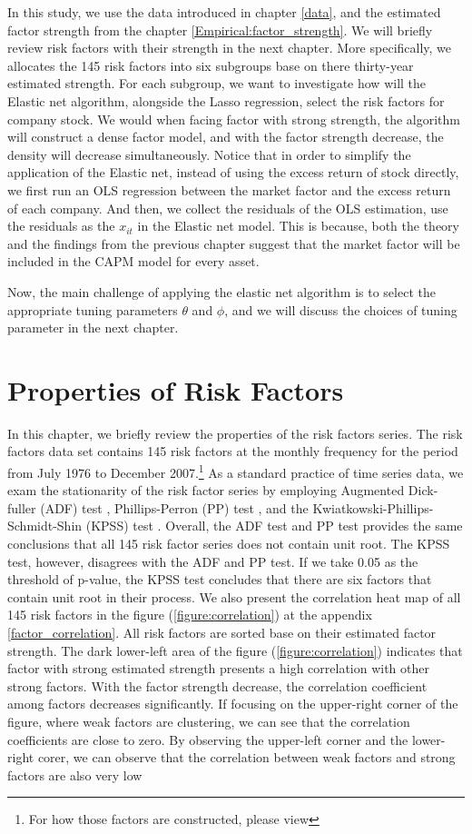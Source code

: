 In this study, we use the data introduced in chapter \ref{data}, and the estimated factor strength from the chapter \ref{Empirical:factor_strength}.
We will briefly review risk factors with their strength in the next chapter.
More specifically, we allocates the 145 risk factors into six subgroups base on there thirty-year estimated strength.
For each subgroup, we want to investigate how will the Elastic net algorithm, alongside the Lasso regression, select the risk factors for company stock.
We would when facing factor with strong strength, the algorithm will construct a dense factor model, and with the factor strength decrease, the density will decrease simultaneously.
Notice that in order to simplify the application of the Elastic net, instead of using the excess return of stock directly, we first run an OLS regression between the market factor and the excess return of each company.
And then, we collect the residuals of the OLS estimation, use the residuals as the $x_{it}$ in the Elastic net model.
This is because, both the theory and the findings from the previous chapter suggest that the market factor will be included in the CAPM model for every asset.

Now, the main challenge of applying the elastic net algorithm is to select the appropriate tuning parameters $\theta$ and $\phi$, and we will discuss the choices of tuning parameter in the next chapter.

\section{Properties of Risk Factors}
In this chapter, we briefly review the properties of the risk factors series. 
The risk factors data set contains 145 risk factors at the monthly frequency for the period from July 1976 to December 2007.\footnote{For how those factors are constructed, please view }
As a standard practice of time series data, we exam the stationarity of the risk factor series by employing Augmented Dick-fuller (ADF) test \cite{Dickey1979},  Phillips-Perron (PP) test \cite{Phillips1988}, and the Kwiatkowski-Phillips-Schmidt-Shin (KPSS) test \cite{Kwiatkowski1992}.
Overall, the ADF test and PP test provides the same conclusions that all 145 risk factor series does not contain unit root.
The KPSS test, however, disagrees with the ADF and PP test.
If we take 0.05 as the threshold of p-value, the KPSS test concludes that there are six factors that contain unit root in their process.
We also present the correlation heat map of all 145 risk factors in the figure (\ref{figure:correlation}) at the appendix \ref{factor_correlation}.
All risk factors are sorted base on their estimated factor strength.
The dark lower-left area of the figure (\ref{figure:correlation}) indicates that factor with strong estimated strength presents a high correlation with other strong factors.
With the factor strength decrease, the correlation coefficient among factors decreases significantly.
If focusing on the upper-right corner of the figure, where weak factors are clustering, we can see that the correlation coefficients are close to zero.
By observing the upper-left corner and the lower-right corer, we can observe that the correlation between weak factors and strong factors are also very low


